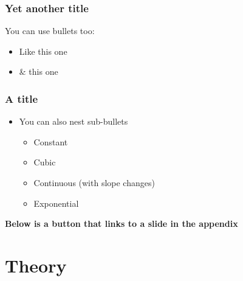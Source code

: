 \documentclass[
    11pt, %
    aspectratio=169, %
]{beamer}
\begin{document}
\begin{frame}
	\frametitle{Yet another title}
            You can use bullets too:\newline
            \begin{itemize}
                \item Like this one\newline
                \item \& this one
            \end{itemize}
\end{frame}

\begin{frame}
\label{Test} %
	\frametitle{A title}

        \begin{itemize}
            \item You can also nest sub-bullets
            \begin{itemize}
                \item Constant
                \item Cubic
                \item Continuous (with slope changes)
                \item Exponential \newline
            \end{itemize}
        \end{itemize}

        \textbf{Below is a button that links to a slide in the appendix}

        \begin{center}
            \hyperlink{Figure}{}
        \end{center}
\end{frame}

\section{Theory}
\end{document}
